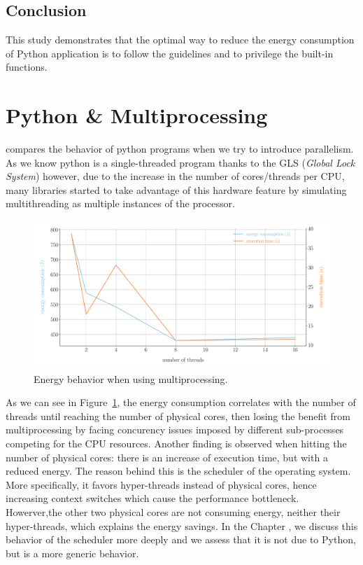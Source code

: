 \subsection{Conclusion}
This study demonstrates that the optimal way to reduce the energy consumption of Python application is to follow the guidelines and to privilege the built-in functions.


\section{Python \& Multiprocessing}
 compares the behavior of python programs when we try to introduce parallelism.
As we know python is a single-threaded program thanks to the GLS (\emph{Global Lock System}) however, due to the increase in the number of cores/threads per CPU, many libraries started to take advantage of this hardware feature by simulating multithreading as multiple instances of the processor. %

\begin{figure}[hbt]
    \centering
    \includegraphics[width=\linewidth]{imgs/multiprocessing_energyvstime}
    \caption{Energy behavior when using multiprocessing.}
    \label{fig:python_multiprocessing}
\end{figure}

As we can see in Figure~\ref{fig:python_multiprocessing}, the energy consumption correlates with the number of threads until reaching the number of physical cores, then losing the benefit from multiprocessing by facing concurency issues imposed by different sub-processes competing for the CPU resources.
Another finding is observed when hitting the number of physical cores: there is an increase of execution time, but with a reduced energy.
The reason behind this is the scheduler of the operating system.
More specifically, it favors hyper-threads instead of physical cores, hence increasing context switches which cause the performance bottleneck.
Howerver,the other two physical cores are not consuming energy, neither their hyper-threads, which explains the energy savings.
In the Chapter , %
we discuss this behavior of the scheduler more deeply and we assess that it is not due to Python, but is a more generic behavior. %

